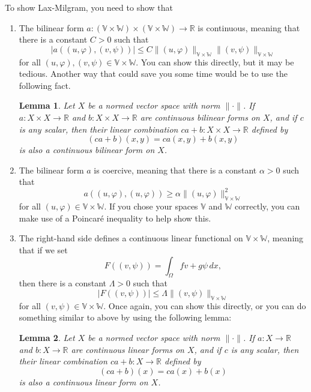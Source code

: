 \documentclass{article}
\theoremstyle{plain}
\newtheorem{lemma}{Lemma}
\theoremstyle{definition}
\theoremstyle{remark}
\begin{document}
\begin{enumerate}
	      To show Lax-Milgram, you need to show that
	      \begin{enumerate}
		      \item The bilinear form $a: (\mathbb V \times \mathbb W) \times (\mathbb V \times \mathbb W) \to \mathbb R$ is continuous, meaning that there is a constant $C > 0$ such that \[|a((u,\varphi),(v,\psi))| \leq C\|(u,\varphi)\|_{\mathbb V \times \mathbb W}\|(v,\psi)\|_{\mathbb V \times \mathbb W}\] for all $(u,\varphi), (v,\psi) \in \mathbb V \times \mathbb W$.
		            You can show this directly, but it may be tedious.
		            Another way that could save you some time would be to use the following fact.
		            \begin{lemma}
			            Let $X$ be a normed vector space with norm $\|\cdot\|$. If $a : X \times X \to \mathbb R$ and $b : X \times X \to \mathbb R$ are continuous bilinear forms on $X$, and if $c$ is any scalar, then their linear combination $ca + b: X \times X \to \mathbb R$ defined by \[(ca+b)(x,y) = ca(x,y) + b(x,y)\] is also a continuous bilinear form on $X$.
		            \end{lemma}
		      \item The bilinear form $a$ is coercive, meaning that there is a constant $\alpha > 0$ such that \[a((u,\varphi),(u,\varphi)) \geq \alpha \|(u,\varphi)\|_{\mathbb V \times \mathbb W}^2\] for all $(u,\varphi) \in \mathbb V \times \mathbb W$.
		            If you chose your spaces $\mathbb V$ and $\mathbb W$ correctly, you can make use of a Poincar\'e inequality to help show this.
		      \item The right-hand side defines a continuous linear functional on $\mathbb V \times \mathbb W$, meaning that if we set \[F((v,\psi)) = \int_\Omega fv + g\psi\,dx,\]
		            then there is a constant $\Lambda > 0$ such that \[|F((v,\psi))| \leq \Lambda \|(v,\psi)\|_{\mathbb V \times \mathbb W}\] for all $(v,\psi) \in \mathbb V \times \mathbb W$.
		            Once again, you can show this directly, or you can do something similar to above by using the following lemma:
		            \begin{lemma}
			            Let $X$ be a normed vector space with norm $\|\cdot\|$. If $a : X \to \mathbb R$ and $b : X \to \mathbb R$ are continuous linear forms on $X$, and if $c$ is any scalar, then their linear combination $ca + b: X \to \mathbb R$ defined by \[(ca+b)(x) = ca(x) + b(x)\] is also a continuous linear form on $X$.
		            \end{lemma}
	      \end{enumerate}

\end{enumerate}
\end{document}
